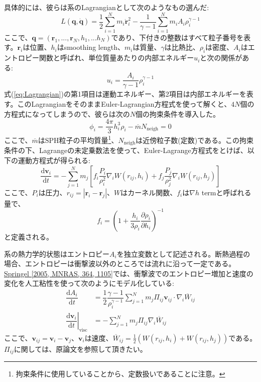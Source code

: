 具体的には、彼らは系のLagrangianとして次のようなもの選んだ:
\begin{equation}
L(\bm{q}, \dot{\bm{q}}) = \dfrac{1}{2}\sum^{N}_{i=1}m_{i}\dot{\bm{r}}^{2}_{i} - \dfrac{1}{\gamma -1}\sum^{N}_{i=1}m_{i}A_{i}\rho^{\gamma-1}_{i} \label{eq:Lagrangian}
\end{equation}
ここで、$\bm{q}=(\bm{r}_{1},...,\bm{r}_{N},h_{1},...h_{N})$であり、下付きの整数はすべて粒子番号を表す。$\bm{r}_{i}$は位置、$h_{i}$はsmoothing length、$m_{i}$は質量、$\gamma$は比熱比、$\rho_{i}$は密度、$A_{i}$はエントロピー関数と呼ばれ、単位質量あたりの内部エネルギー$u_{i}$と次の関係がある:
\begin{equation}
u_{i} = \dfrac{A_{i}}{\gamma-1}\rho^{\gamma-1}_{i} \label{eq:relation_between_u_A_rho}
\end{equation}
式(\ref{eq:Lagrangian})の第1項目は運動エネルギー、第2項目は内部エネルギーを表す。このLagrangianをそのままEuler-Lagrangian方程式を使って解くと、$4N$個の方程式になってしまうので、彼らは次の$N$個の拘束条件を導入した。
\begin{equation}
\phi_{i} = \dfrac{4\pi}{3}h^{3}_{i}\rho_{i} - \overline{m}N_{\mathrm{neigh}}=0 \label{eq:Springel_SPH_constraints}
\end{equation}
ここで、$\overline{m}$はSPH粒子の平均質量\footnote{拘束条件に使用していることから、定数扱いであることに注意。}、$N_{\mathrm{neigh}}$は近傍粒子数(定数)である。この拘束条件の下、Lagrangeの未定乗数法を使って、Euler-Lagrange方程式をとけば、以下の運動方程式が得られる:
\begin{equation}
\dfrac{\mathrm{d}\bm{v}_{i}}{\mathrm{d}t} = - \sum^{N}_{j=1}m_{j}\left[f_{i}\dfrac{P_{i}}{\rho^{2}_{i}}\nabla_{i}W(r_{ij},h_{i})+f_{j}\dfrac{P_{j}}{\rho^{2}_{j}}\nabla_{i}W(r_{ij},h_{j})\right] \label{eq:Springel_SPH_EoM_pure_hydro}
\end{equation}
ここで、$P_{i}$は圧力、$r_{ij}=|\bm{r}_{i}-\bm{r}_{j}|$、$W$はカーネル関数、$f_{i}$は$\nabla h$ termと呼ばれる量で、
\begin{equation}
f_{i} = \left(1 + \dfrac{h_{i}}{3\rho_{i}}\dfrac{\partial \rho_{i}}{\partial h_{i}}\right)^{-1} \label{eq:gradh_term}
\end{equation}
と定義される。

系の熱力学的状態はエントロピー$A_{i}$を独立変数として記述される。断熱過程の場合、エントロピーは衝撃波以外のところでは流れに沿って一定である。
\href{https://doi.org/10.1111/j.1365-2966.2005.09655.x}{Springel [2005, MNRAS, 364, 1105]}では、衝撃波でのエントロピー増加と速度の変化を人工粘性を使って次のようにモデル化している:
\begin{align}
\dfrac{\mathrm{d}A_{i}}{\mathrm{d}t} & = \dfrac{1}{2}\dfrac{\gamma-1}{\rho^{\gamma-1}_{i}}\sum^{N}_{j=1}m_{j}\Pi_{ij}\bm{v}_{ij}\cdot\nabla_{i}\overline{W}_{ij} \label{eq:Springel_SPH_entropy_eq} \\
\left.\dfrac{\mathrm{d}\bm{v}_{i}}{\mathrm{d}t}\right|_{\mathrm{visc}} & = -\sum^{N}_{j=1}m_{j}\Pi_{ij}\nabla_{i}\overline{W}_{ij} \label{eq:Springel_SPH_EoM_art_vis}
\end{align}
ここで、$\bm{v}_{ij}=\bm{v}_{i}-\bm{v}_{j}$、$\bm{v}_{i}$は速度、$\overline{W}_{ij}=\frac{1}{2}(W(r_{ij},h_{i})+W(r_{ij},h_{j}))$である。$\Pi_{ij}$に関しては、原論文を参照して頂きたい。

